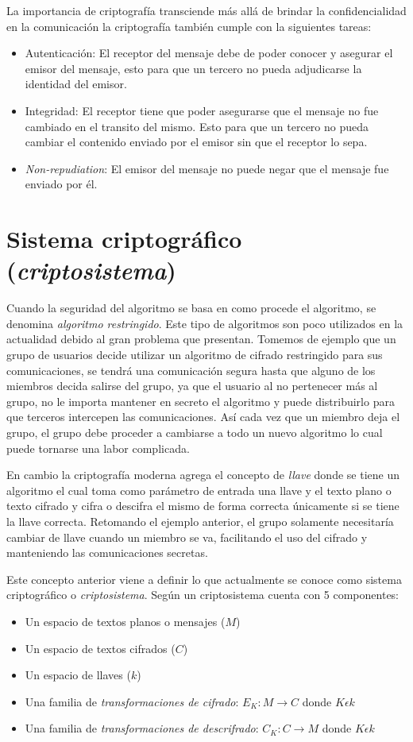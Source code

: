 La importancia de criptografía transciende más allá de brindar la confidencialidad en la comunicación la criptografía también cumple con la siguientes tareas:
\begin{itemize}
\item Autenticación: El receptor del mensaje debe de poder conocer y asegurar el emisor del mensaje, esto para que un tercero no pueda adjudicarse la identidad del emisor.
\item Integridad: El receptor tiene que poder asegurarse que el mensaje no fue cambiado en el transito del mismo. Esto para que un tercero no pueda cambiar el contenido enviado por el emisor sin que el receptor lo sepa.
\item \textit{Non-repudiation}: El emisor del mensaje no puede negar que el mensaje fue enviado por él. 
\end{itemize}

\section{Sistema criptográfico (\textit{criptosistema})}
Cuando la seguridad del algoritmo se basa en como procede el algoritmo, se denomina \textit{algoritmo restringido}. Este tipo de algoritmos son poco utilizados en la actualidad debido al gran problema que presentan. Tomemos de ejemplo que un grupo de usuarios decide utilizar un algoritmo de cifrado restringido para sus comunicaciones, se tendrá una comunicación segura hasta que alguno de los miembros decida salirse del grupo, ya que el usuario al no pertenecer más al grupo, no le importa mantener en secreto el algoritmo y puede distribuirlo para que terceros intercepen las comunicaciones. Así cada vez que un miembro deja el grupo, el grupo debe proceder a cambiarse a todo un nuevo algoritmo lo cual puede tornarse una labor complicada.

En cambio la criptografía moderna \cite{denning} agrega el concepto de \textit{llave} donde se tiene un algoritmo el cual toma como parámetro de entrada una llave y el texto plano o texto cifrado y cifra o descifra el mismo de forma correcta únicamente si se tiene la llave correcta. Retomando el ejemplo anterior, el grupo solamente necesitaría cambiar de llave cuando un miembro se va, facilitando el uso del cifrado y manteniendo las comunicaciones secretas.

Este concepto anterior viene a definir lo que actualmente se conoce como sistema criptográfico o \textit{criptosistema}. Según \cite{denning} un criptosistema cuenta con 5 componentes:
\begin{itemize}
\item Un espacio de textos planos o mensajes ($M$)
\item Un espacio de textos cifrados ($C$)
\item Un espacio de llaves ($k$)
\item Una familia de \textit{transformaciones de cifrado}: $E_K: M\rightarrow C$ donde $K \epsilon  k$
\item Una familia de \textit{transformaciones de descrifrado}: $C_K: C\rightarrow M$ donde $K \epsilon  k$
\end{itemize} 



